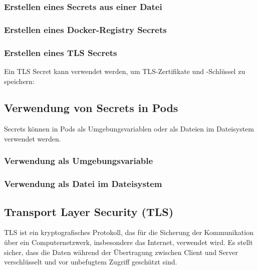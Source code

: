 

\subsubsection{Erstellen eines Secrets aus einer Datei}



\subsubsection{Erstellen eines Docker-Registry Secrets}


\subsubsection{Erstellen eines TLS Secrets}
Ein TLS Secret kann verwendet werden, um TLS-Zertifikate und -Schlüssel zu speichern:


\subsection{Verwendung von Secrets in Pods}
Secrets können in Pods als Umgebungsvariablen oder als Dateien im Dateisystem verwendet werden.

\subsubsection{Verwendung als Umgebungsvariable}



\subsubsection{Verwendung als Datei im Dateisystem}



\subsection{Transport Layer Security (TLS)}

TLS ist ein kryptografisches Protokoll, das für die Sicherung der Kommunikation über ein Computernetzwerk, insbesondere das Internet, verwendet wird. Es stellt sicher, dass die Daten während der Übertragung zwischen Client und Server verschlüsselt und vor unbefugtem Zugriff geschützt sind. 

